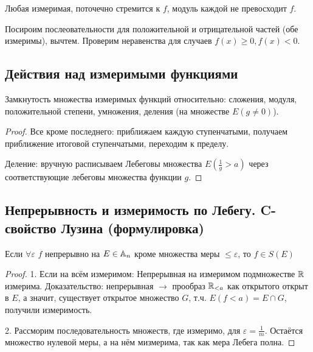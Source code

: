 \documentclass[12pt, a4paper, oneside]{memoir}
\begin{document}
\begin{corollary}

    Любая измеримая, поточечно стремится к $f$, модуль каждой не превосходит $f$.

    Посироим послеовательности для положительной и отрицательной частей (обе измеримы), вычтем.
    Проверим неравенства для случаев $f(x) \geqslant 0, f(x) < 0$.
\end{corollary}


\subsection{Действия над измеримыми функциями}


\begin{theorem}

    Замкнутость множества измеримых функций относительно:
    сложения, модуля, положительной степени, умножения, деления (на множестве $E(g \neq 0)$).

    \begin{proof}
        Все кроме последнего: 
        приближаем каждую ступенчатыми,
        получаем приближение итоговой ступенчатыми,
        переходим к пределу.

        Деление: вручную расписываем Лебеговы множества 
        $E\left(\frac{1}{g} > a\right)$ через соответствующие лебеговы множества функции $g$.
    \end{proof}
\end{theorem}



\subsection{Непрерывность и измеримость по Лебегу. C-свойство Лузина (формулировка)}

\begin{theorem}

    Если $\forall \varepsilon$ $f$ непрерывно на $E \in {\mathbb{A}}_n$ кроме множества меры $\leqslant \varepsilon$, то $f \in S(E)$

    \begin{proof}
        1. Если на всём измеримом: Непрерывная на измеримом подмножестве ${\mathbb{R}}$ измерима.
        Доказательство: непрерывная $→$ прообраз ${\mathbb{R}}_{< a}$ как открытого открыт в $E$, 
        а значит, существует открытое множество $G$, т.ч. $E(f < a) = E \cap G$, получили измеримость.

        2. Рассморим последовательность множеств, где измеримо, для $\varepsilon = \frac{1}{m}$. Остаётся множество нулевой меры, 
        а на нём мизмерима, так как мера Лебега полна.
    \end{proof}
\end{theorem}
\end{document}
